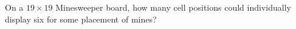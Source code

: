 On a $19\times19$ Minesweeper board, how many cell positions could individually display six for some placement of mines?
